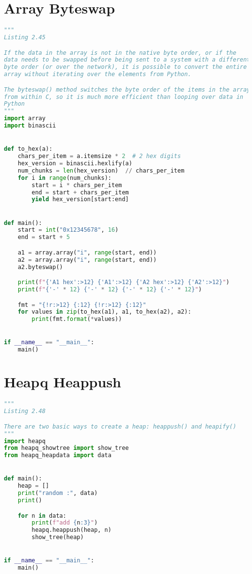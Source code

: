 \documentclass[a4paper,landscape]{report}
\begin{document}
\section{Array Byteswap}
\begin{lstlisting}[language=Python]
"""
Listing 2.45

If the data in the array is not in the native byte order, or if the
data needs to be swapped before being sent to a system with a different
byte order (or over the network), it is possible to convert the entire
array without iterating over the elements from Python.

The byteswap() method switches the byte order of the items in the array
from within C, so it is much more efficient than looping over data in
Python
"""
import array
import binascii


def to_hex(a):
    chars_per_item = a.itemsize * 2  # 2 hex digits
    hex_version = binascii.hexlify(a)
    num_chunks = len(hex_version)  // chars_per_item
    for i in range(num_chunks):
        start = i * chars_per_item
        end = start + chars_per_item
        yield hex_version[start:end]


def main():
    start = int("0x12345678", 16)
    end = start + 5

    a1 = array.array("i", range(start, end))
    a2 = array.array("i", range(start, end))
    a2.byteswap()

    print(f"{'A1 hex':>12} {'A1':>12} {'A2 hex':>12} {'A2':>12}")
    print(f"{'-' * 12} {'-' * 12} {'-' * 12} {'-' * 12}")

    fmt = "{!r:>12} {:12} {!r:>12} {:12}"
    for values in zip(to_hex(a1), a1, to_hex(a2), a2):
        print(fmt.format(*values))


if __name__ == "__main__":
    main()

\end{lstlisting}
\section{Heapq Heappush}
\begin{lstlisting}[language=Python]
"""
Listing 2.48

There are two basic ways to create a heap: heappush() and heapify()
"""
import heapq
from heapq_showtree import show_tree
from heapq_heapdata import data


def main():
    heap = []
    print("random :", data)
    print()

    for n in data:
        print(f"add {n:3}")
        heapq.heappush(heap, n)
        show_tree(heap)


if __name__ == "__main__":
    main()

\end{lstlisting}
\end{document}

